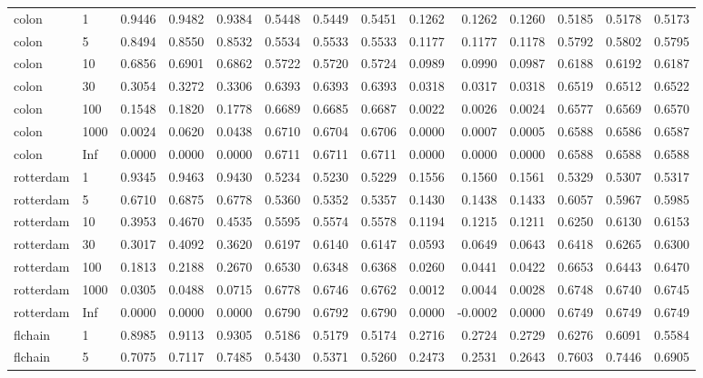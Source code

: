 \begin{tabular}{llrrrrrrrrrrrr}
  colon & 1 & 0.9446 & 0.9482 & 0.9384 & 0.5448 & 0.5449 & 0.5451 & 0.1262 & 0.1262 & 0.1260 & 0.5185 & 0.5178 & 0.5173 \\ 
  colon & 5 & 0.8494 & 0.8550 & 0.8532 & 0.5534 & 0.5533 & 0.5533 & 0.1177 & 0.1177 & 0.1178 & 0.5792 & 0.5802 & 0.5795 \\ 
  colon & 10 & 0.6856 & 0.6901 & 0.6862 & 0.5722 & 0.5720 & 0.5724 & 0.0989 & 0.0990 & 0.0987 & 0.6188 & 0.6192 & 0.6187 \\ 
  colon & 30 & 0.3054 & 0.3272 & 0.3306 & 0.6393 & 0.6393 & 0.6393 & 0.0318 & 0.0317 & 0.0318 & 0.6519 & 0.6512 & 0.6522 \\ 
  colon & 100 & 0.1548 & 0.1820 & 0.1778 & 0.6689 & 0.6685 & 0.6687 & 0.0022 & 0.0026 & 0.0024 & 0.6577 & 0.6569 & 0.6570 \\ 
  colon & 1000 & 0.0024 & 0.0620 & 0.0438 & 0.6710 & 0.6704 & 0.6706 & 0.0000 & 0.0007 & 0.0005 & 0.6588 & 0.6586 & 0.6587 \\ 
  colon & Inf & 0.0000 & 0.0000 & 0.0000 & 0.6711 & 0.6711 & 0.6711 & 0.0000 & 0.0000 & 0.0000 & 0.6588 & 0.6588 & 0.6588 \\ 
  rotterdam & 1 & 0.9345 & 0.9463 & 0.9430 & 0.5234 & 0.5230 & 0.5229 & 0.1556 & 0.1560 & 0.1561 & 0.5329 & 0.5307 & 0.5317 \\ 
  rotterdam & 5 & 0.6710 & 0.6875 & 0.6778 & 0.5360 & 0.5352 & 0.5357 & 0.1430 & 0.1438 & 0.1433 & 0.6057 & 0.5967 & 0.5985 \\ 
  rotterdam & 10 & 0.3953 & 0.4670 & 0.4535 & 0.5595 & 0.5574 & 0.5578 & 0.1194 & 0.1215 & 0.1211 & 0.6250 & 0.6130 & 0.6153 \\ 
  rotterdam & 30 & 0.3017 & 0.4092 & 0.3620 & 0.6197 & 0.6140 & 0.6147 & 0.0593 & 0.0649 & 0.0643 & 0.6418 & 0.6265 & 0.6300 \\ 
  rotterdam & 100 & 0.1813 & 0.2188 & 0.2670 & 0.6530 & 0.6348 & 0.6368 & 0.0260 & 0.0441 & 0.0422 & 0.6653 & 0.6443 & 0.6470 \\ 
  rotterdam & 1000 & 0.0305 & 0.0488 & 0.0715 & 0.6778 & 0.6746 & 0.6762 & 0.0012 & 0.0044 & 0.0028 & 0.6748 & 0.6740 & 0.6745 \\ 
  rotterdam & Inf & 0.0000 & 0.0000 & 0.0000 & 0.6790 & 0.6792 & 0.6790 & 0.0000 & -0.0002 & 0.0000 & 0.6749 & 0.6749 & 0.6749 \\ 
  flchain & 1 & 0.8985 & 0.9113 & 0.9305 & 0.5186 & 0.5179 & 0.5174 & 0.2716 & 0.2724 & 0.2729 & 0.6276 & 0.6091 & 0.5584 \\ 
  flchain & 5 & 0.7075 & 0.7117 & 0.7485 & 0.5430 & 0.5371 & 0.5260 & 0.2473 & 0.2531 & 0.2643 & 0.7603 & 0.7446 & 0.6905 \\ 

\end{tabular}
